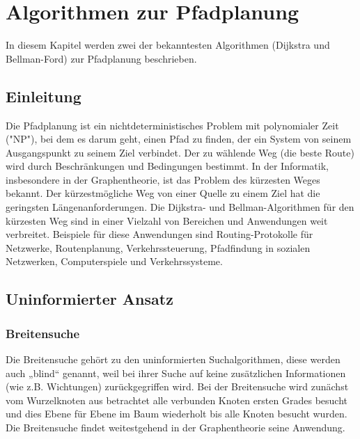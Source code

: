 \chapter{Algorithmen zur Pfadplanung}
In diesem Kapitel werden zwei der bekanntesten Algorithmen (Dijkstra und Bellman-Ford) zur Pfadplanung beschrieben.

\section{Einleitung}
\label{Was ist Pfadplanung?}
Die Pfadplanung ist ein nichtdeterministisches Problem mit polynomialer Zeit ("NP"), bei dem es darum geht, einen Pfad zu finden, der ein System von seinem Ausgangspunkt zu seinem Ziel verbindet. Der zu wählende Weg (die beste Route) wird durch Beschränkungen und Bedingungen bestimmt\cite{Karur:21}.
\newline
\newline
In der Informatik, insbesondere in der Graphentheorie, ist das Problem des kürzesten Weges bekannt. Der kürzestmögliche Weg von einer Quelle zu einem Ziel hat die geringsten Längenanforderungen.
\newline
\newline
Die Dijkstra- und Bellman-Algorithmen für den kürzesten Weg sind in einer Vielzahl von Bereichen und Anwendungen weit verbreitet. Beispiele für diese Anwendungen sind Routing-Protokolle für Netzwerke, Routenplanung, Verkehrssteuerung, Pfadfindung in sozialen Netzwerken, Computerspiele und Verkehrssysteme\cite{Panda:18}.

\section{Uninformierter Ansatz}
\label{Uninformierter Ansatz}
\subsection{Breitensuche}
Die Breitensuche gehört zu den uninformierten Suchalgorithmen, diese werden auch „blind“ genannt, weil bei ihrer 
Suche auf keine zusätzlichen Informationen (wie z.B. Wichtungen) zurückgegriffen wird.
Bei der Breitensuche wird zunächst vom Wurzelknoten aus betrachtet alle verbunden Knoten ersten Grades besucht
und dies Ebene für Ebene im Baum wiederholt bis alle Knoten besucht wurden. 
Die Breitensuche findet weitestgehend in der Graphentheorie seine Anwendung.\cite{Russell:10b}
\\
\\
\\
\\
